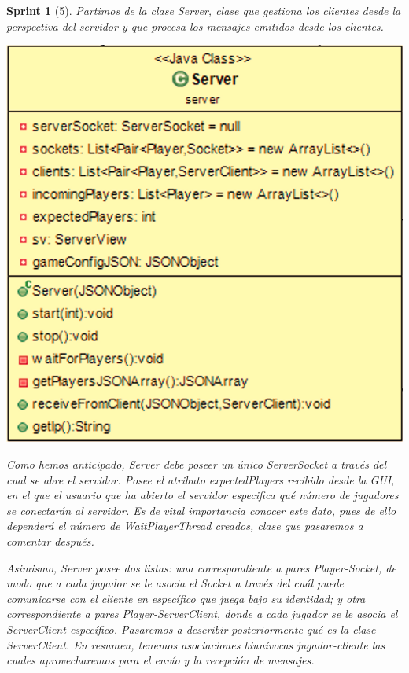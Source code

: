 \documentclass[12pt,a4paper,openright]{book}
\theoremstyle{break}
\newtheorem*{sprint}{Sprint}
\begin{document}
\begin{sprint}[5]
Partimos de la clase Server, clase que gestiona los clientes desde la perspectiva del servidor y que procesa los mensajes emitidos desde los clientes.

\begin{center}
\includegraphics[scale=0.3]{Server-sprint5.png} 
\end{center}

Como hemos anticipado, Server debe poseer un único ServerSocket a través del cual se abre el servidor. Posee el atributo expectedPlayers recibido desde la GUI, en el que el usuario que ha abierto el servidor especifica qué número de jugadores se conectarán al servidor. Es de vital importancia conocer este dato, pues de ello dependerá el número de WaitPlayerThread creados, clase que pasaremos a comentar después.

Asimismo, Server posee dos listas: una correspondiente a pares Player-Socket, de modo que a cada jugador se le asocia el Socket a través del cuál puede comunicarse con el cliente en específico que juega bajo su identidad; y otra correspondiente a pares Player-ServerClient, donde a cada jugador se le asocia el ServerClient específico. Pasaremos a describir posteriormente qué es la clase ServerClient.
En resumen, tenemos asociaciones biunívocas jugador-cliente las cuales aprovecharemos para el envío y la recepción de mensajes.



\end{sprint}
\end{document}
